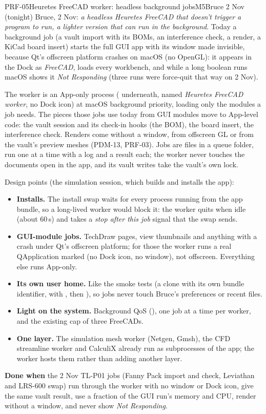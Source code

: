 \begin{epic}{PRF-05}{Heuretes FreeCAD worker: headless background jobs}{M5}{\stTodo}{Bruce 2 Nov (tonight)}
Bruce, 2 Nov: \emph{a headless Heuretes FreeCAD that doesn't trigger a program to run, a lighter version that can run
in the background}. Today a background job (a vault import with its BOMs, an interference check, a render, a
KiCad board insert) starts the full GUI app with its window made invisible, because Qt's offscreen platform
crashes on macOS (no OpenGL): it appears in the Dock as \emph{FreeCAD}, loads every workbench, and while a long
boolean runs macOS shows it \emph{Not Responding} (three runs were force-quit that way on 2 Nov).

The worker is an App-only process ( underneath, named \emph{Heuretes FreeCAD worker}, no Dock icon)
at macOS background priority, loading only the modules a job needs. The pieces those jobs use today from GUI
modules move to App-level code: the vault session and its check-in hooks (the BOM), the board insert, the
interference check. Renders come without a window, from offscreen GL or from the vault's preview meshes
(PDM-13, PRF-03). Jobs are files in a queue folder, run one at a time with a log and a result each; the worker
never touches the documents open in the app, and its vault writes take the vault's own lock.

Design points (the simulation session, which builds and installs the app):
\begin{itemize}
\item \textbf{Installs.} The install swap waits for every process running from the app bundle, so a long-lived
worker would block it: the worker quits when idle (about 60\,s) and takes a \emph{stop after this job} signal
that the swap sends.
\item \textbf{GUI-module jobs.} TechDraw pages, view thumbnails and anything with a  crash
under Qt's offscreen platform; for those the worker runs a real QApplication marked  (no Dock
icon, no window), not offscreen. Everything else runs App-only.
\item \textbf{Its own user home.} Like the smoke tests (a  clone with its own bundle identifier,
 with , then ), so jobs never touch Bruce's
preferences or recent files.
\item \textbf{Light on the system.} Background QoS (), one job at a time per worker, and the
existing cap of three FreeCADs.
\item \textbf{One layer.} The simulation mesh worker (Netgen, Gmsh), the CFD streamline worker and CalculiX
already run as subprocesses of the app; the worker hosts them rather than adding another layer.
\end{itemize}

\textbf{Done when} the 2 Nov TL-P01 jobs (Fanny Pack import and check, Leviathan and LRS-600 swap) run through
the worker with no window or Dock icon, give the same vault result, use a fraction of the GUI run's memory and
CPU, render without a window, and never show \emph{Not Responding}.
\end{epic}
